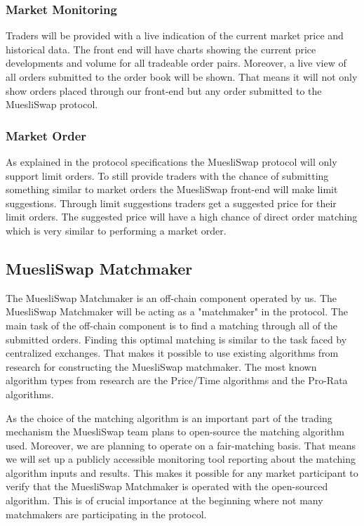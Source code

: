 \documentclass[11pt]{article}
\begin{document}
\subsubsection{Market Monitoring}
Traders will be provided with a live indication of the current market price and historical data. The front end will have charts showing the current price developments and volume for all tradeable order pairs. Moreover, a live view of all orders submitted to the order book will be shown. That means it will not only show orders placed through our front-end but any order submitted to the MuesliSwap protocol.

\subsubsection{Market Order}
As explained in the protocol specifications the MuesliSwap protocol will only support limit orders. To still provide traders with the chance of submitting something similar to market orders the MuesliSwap front-end will make limit suggestions. Through limit suggestions traders get a suggested price for their limit orders. The suggested price will have a high chance of direct order matching which is very similar to performing a market order.


\subsection{MuesliSwap Matchmaker}
The MuesliSwap Matchmaker is an off-chain component operated by us. The MuesliSwap Matchmaker will be acting as a "matchmaker" in the protocol. The main task of the off-chain component is to find a matching through all of the submitted orders. Finding this optimal matching is similar to the task faced by centralized exchanges. That makes it possible to use existing algorithms from research for constructing the MuesliSwap matchmaker. The most known algorithm types from research are the Price/Time algorithms and the Pro-Rata algorithms. \cite{janecek2007matching}

As the choice of the matching algorithm is an important part of the trading mechanism the MuesliSwap team plans to open-source the matching algorithm used. Moreover, we are planning to operate on a fair-matching basis. That means we will set up a publicly accessible monitoring tool reporting about the matching algorithm inputs and results. This makes it possible for any market participant to verify that the MuesliSwap Matchmaker is operated with the open-sourced algorithm. This is of crucial importance at the beginning where not many matchmakers are participating in the protocol.
\end{document}
